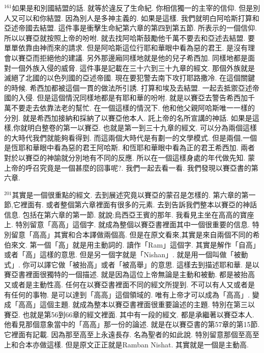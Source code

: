\documentclass{book}
\begin{document}
$^{161}$如果是和別國結盟的話.
就等於違反了生命紀.
你相信獨一的主宰的信仰.
但是別人又可以和你結盟.
因為別人是多神主義的.
如果是這樣.
我們就明白阿哈斯打算和亞述帝國去結盟.
這件事是衝擊生命紀第六章的第四到第五節.
所表示的一個信仰.
所以以賽亞就按照上帝的吩咐.
就去找阿哈斯鼓勵他千萬不要去和亞述去結盟.
要單單依靠由神而來的請求.
但是阿哈斯這位行耶和華眼中看為惡的君王.
是沒有理會以賽亞而拒絕他的建議.
另外那邊廂同樣地就是他的兒子希西加.
同樣地都是面對一個外族入侵的威脅.
這件事是記載在三十六到三十九章的經文.
那個外族就是滅絕了北國的以色列國的亞述帝國.
現在要犯警去南下攻打耶路撒冷.
在這個關鍵的時候.
希西加都被這個一貫的做法所引誘.
打算和埃及去結盟.
一起去抵禦亞述帝國的入侵.
但是這個情況同樣地都是有耶和華的吩咐.
就是以賽亞去警告希西加千萬不要走去依靠法老的幫忙.
在一個這樣的情況下.
他和他父親阿哈斯唯一一樣的分別.
就是希西加接納和採納了以賽亞他本人.
託上帝的名所宣講的神話.
如果是這樣,你就明白整卷的第一以賽亞.
也就是第一到三十九章的經文.
可以分為兩個這樣的大時代我們就能夠看得到.
而這兩個大時代是有劃一的文學模式.
但是兩個,一個是恆耶和華眼中看為惡的君王阿哈斯.
和恆耶和華眼中看為正的君王希西加.
兩者對於以賽亞的神諭就分別地有不同的反應.
所以在一個這樣身處的年代做先知.
蒙上帝的呼召究竟是一個甚麼的回事呢?.
我們一起去看一看.
我們發現以賽亞書的第六章.

$^{201}$其實是一個很重點的經文.
去到展述究竟以賽亞的蒙召是怎樣的.
第六章的第一節,它裡面有.
或者整個第六章裡面有很多的元素.
去到告訴我們整本以賽亞的神話信息.
包括在第六章的第一節.
就說:烏西亞王賓的那年.
我看見主坐在高高的寶座上.
特別留意「高高」這個字.
就成為整個以賽亞書裡面其中一個很重要的信息.
特別留意「高高」其實和合本譯做兩個高.
但是在原文看來,其實是來自兩個不同的希伯來文.
第一個「高」就是用主動詞的.
讀作「Ram」這個字.
其實是解作「自高」或者「高」這樣的意思.
但是另一個字就是「Nishan」.
就是用一個叫做「被動式」.
你可以譯它做「被抬高」或者「被高舉」的意思.
這樣去到描述耶和華.
是以賽亞書裡面很獨特的一個描述.
就是因為這位上帝無論是主動和被動.
都是被抬高又或者是主動性高.
任何在以賽亞書裡面不同的經文所提到.
不可以有人又或者是有任何的事物.
是可以達到「高高」這個領域的.
唯有上帝才可以成為「高高」.
變成「高高」這個主題.
就成為整本以賽亞書裡面很重要論述的主題.
特別在第三以賽亞.
也就是第56到66章的經文裡面.
其中有一段的經文.
都是承繼著以賽亞本人.
他看見那個意象當中的「高高」那一份的論述.
就是在以賽亞書的第57章的第15節.
它裡面有記載.
因為那至高至上永遠長存.
名為聖者的如此說.
特別留意那個至高至上和合本亦做這樣.
但是原文正正就是Ramban Nishat.
其實就是一個是主動高.
\end{document}
